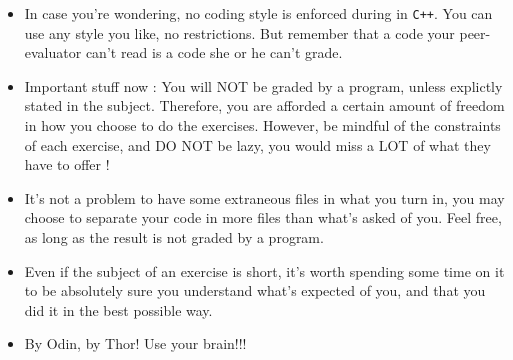 \begin{itemize}
        \item In case you're wondering, no coding style is enforced
          during in \texttt{C++}. You can use any style you
          like, no restrictions. But remember that a code your
          peer-evaluator can't read is a code she or he can't grade.

	    \item Important stuff now : You will NOT be graded by a program,
		unless explictly stated in the subject. Therefore, you are afforded
		a certain amount of freedom in how you choose to do the exercises.
		However, be mindful of the constraints of each exercise, and DO NOT
		be lazy, you would miss a LOT of what they have to offer !

		\item It's not a problem to have some extraneous files in what you turn
		in, you may choose to separate your code in more files than what's
		asked of you. Feel free, as long as the result is not graded by a program.
              
		\item Even if the subject of an exercise is short, it's worth spending
		some time on it to be absolutely sure you understand what's expected of
		you, and that you did it in the best possible way.

        \item By Odin, by Thor! Use your brain!!!

\end{itemize}

\newpage
